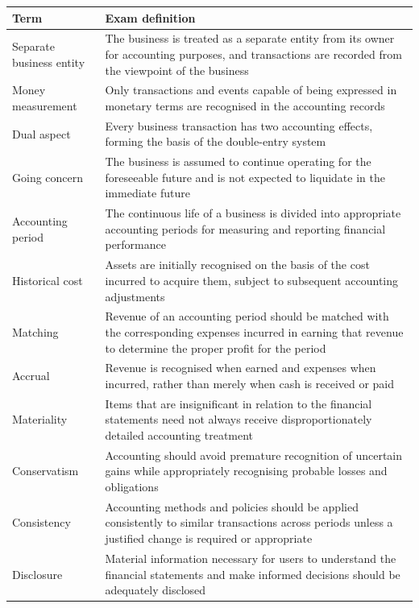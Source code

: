 \documentclass[11pt,a4paper]{article}
\begin{document}
\begin{center}
\small
\begin{tabularx}{\textwidth}{@{}l Y@{}}
\toprule
{}\textbf{Term} & \textbf{Exam definition}\\
\midrule
Separate business entity & The business is treated as a separate entity from its owner for accounting purposes, and transactions are recorded from the viewpoint of the business\\
Money measurement & Only transactions and events capable of being expressed in monetary terms are recognised in the accounting records\\
Dual aspect & Every business transaction has two accounting effects, forming the basis of the double-entry system\\
Going concern & The business is assumed to continue operating for the foreseeable future and is not expected to liquidate in the immediate future\\
Accounting period & The continuous life of a business is divided into appropriate accounting periods for measuring and reporting financial performance\\
Historical cost & Assets are initially recognised on the basis of the cost incurred to acquire them, subject to subsequent accounting adjustments\\
Matching & Revenue of an accounting period should be matched with the corresponding expenses incurred in earning that revenue to determine the proper profit for the period\\
Accrual & Revenue is recognised when earned and expenses when incurred, rather than merely when cash is received or paid\\
Materiality & Items that are insignificant in relation to the financial statements need not always receive disproportionately detailed accounting treatment\\
Conservatism & Accounting should avoid premature recognition of uncertain gains while appropriately recognising probable losses and obligations\\
Consistency & Accounting methods and policies should be applied consistently to similar transactions across periods unless a justified change is required or appropriate\\
Disclosure & Material information necessary for users to understand the financial statements and make informed decisions should be adequately disclosed\\
\bottomrule
\end{tabularx}
\end{center}
\end{document}
